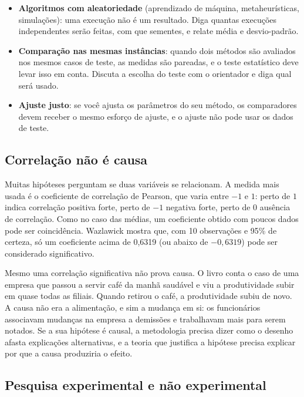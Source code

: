 \documentclass[10pt,a4paper]{extarticle}
\theoremstyle{definition}
\begin{document}
\begin{keybox}
\begin{itemize}
  \item \textbf{Algoritmos com aleatoriedade} (aprendizado de máquina, metaheurísticas, simulações): uma execução não é um resultado. Diga quantas execuções independentes serão feitas, com que sementes, e relate média e desvio-padrão.
  \item \textbf{Comparação nas mesmas instâncias}: quando dois métodos são avaliados nos mesmos casos de teste, as medidas são pareadas, e o teste estatístico deve levar isso em conta. Discuta a escolha do teste com o orientador e diga qual será usado.
  \item \textbf{Ajuste justo}: se você ajusta os parâmetros do seu método, os comparadores devem receber o mesmo esforço de ajuste, e o ajuste não pode usar os dados de teste.
\end{itemize}
\end{keybox}

\subsection{Correlação não é causa}

Muitas hipóteses perguntam se duas variáveis se relacionam. A medida mais usada é o coeficiente de correlação de Pearson, que varia entre $-1$ e $1$: perto de $1$ indica correlação positiva forte, perto de $-1$ negativa forte, perto de $0$ ausência de correlação. Como no caso das médias, um coeficiente obtido com poucos dados pode ser coincidência. Wazlawick mostra que, com 10 observações e 95\% de certeza, só um coeficiente acima de 0,6319 (ou abaixo de $-0{,}6319$) pode ser considerado significativo.

Mesmo uma correlação significativa não prova causa. O livro conta o caso de uma empresa que passou a servir café da manhã saudável e viu a produtividade subir em quase todas as filiais. Quando retirou o café, a produtividade subiu de novo. A causa não era a alimentação, e sim a mudança em si: os funcionários associavam mudanças na empresa a demissões e trabalhavam mais para serem notados. Se a sua hipótese é causal, a metodologia precisa dizer como o desenho afasta explicações alternativas, e a teoria que justifica a hipótese precisa explicar por que a causa produziria o efeito.

\subsection{Pesquisa experimental e não experimental}
\end{document}
